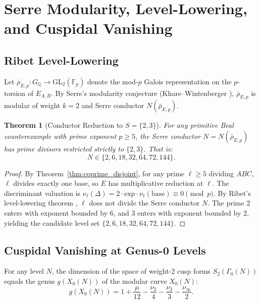 \documentclass[11pt,reqno]{amsart}
\newtheorem{theorem}{Theorem}[section]
\theoremstyle{definition}
\theoremstyle{remark}
\numberwithin{equation}{section}
\begin{document}
\section{Serre Modularity, Level-Lowering, and Cuspidal Vanishing}

\subsection{Ribet Level-Lowering}
Let $\bar{\rho}_{E, p}: G_{\mathbb{Q}} \to \mathrm{GL}_2(\mathbb{F}_p)$ denote the mod-$p$ Galois representation on the $p$-torsion of $E_{A, B}$. By Serre's modularity conjecture (Khare--Wintenberger \cite{KhareWintenberger2009}), $\bar{\rho}_{E, p}$ is modular of weight $k=2$ and Serre conductor $N(\bar{\rho}_{E, p})$.

\begin{theorem}[Conductor Reduction to $S = \{2, 3\}$]\label{thm:serre_reduction}
For any primitive Beal counterexample with prime exponent $p \ge 5$, the Serre conductor $N = N(\bar{\rho}_{E, p})$ has prime divisors restricted strictly to $\{2, 3\}$. That is:
\begin{equation}
N \in \{2, 6, 18, 32, 64, 72, 144\}.
\end{equation}
\end{theorem}

\begin{proof}
By Theorem~\ref{thm:coprime_disjoint}, for any prime $\ell \ge 5$ dividing $ABC$, $\ell$ divides exactly one base, so $E$ has multiplicative reduction at $\ell$. The discriminant valuation is $\nu_\ell(\Delta) = 2 \cdot \text{exp} \cdot \nu_\ell(\text{base}) \equiv 0 \pmod p$. By Ribet's level-lowering theorem \cite{Ribet1990}, $\ell$ does not divide the Serre conductor $N$. The prime 2 enters with exponent bounded by 6, and 3 enters with exponent bounded by 2, yielding the candidate level set $\{2, 6, 18, 32, 64, 72, 144\}$.
\end{proof}

\subsection{Cuspidal Vanishing at Genus-0 Levels}
For any level $N$, the dimension of the space of weight-2 cusp forms $S_2(\Gamma_0(N))$ equals the genus $g(X_0(N))$ of the modular curve $X_0(N)$:
\begin{equation}
g(X_0(N)) = 1 + \frac{\mu}{12} - \frac{\nu_2}{4} - \frac{\nu_3}{3} - \frac{\nu_\infty}{2}.
\end{equation}
\end{document}
